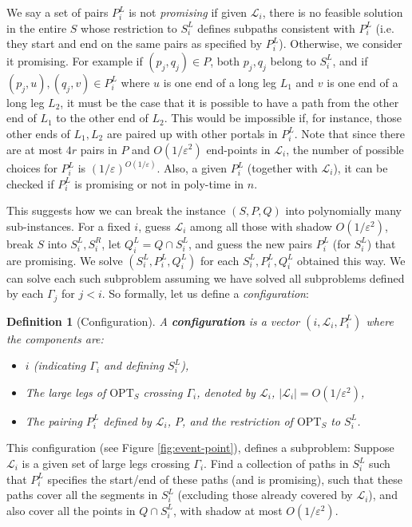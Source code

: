 \documentclass[10pt,a4paper]{amsart}
\theoremstyle{thmstyleone}
\newtheorem{definition}{Definition} %
\newcommand{\eps}{\varepsilon}
\newcommand{\OPT}{{\text{OPT}}}
\begin{document}
We say a set of pairs $P^L_i$ is not {\em promising} if given $\mathcal L_i$, there is no feasible solution in the
entire $S$ whose restriction to $S^L_i$ defines subpaths consistent with $P^L_i$ 
(i.e. they start and end on the same pairs as specified by $P^L_i$). Otherwise, we consider it promising.
For example if $(p_j,q_j)\in P$,
both $ p_j, q_j $ belong to $S^L_i$, and if $(p_j,u),(q_j,v)\in P^L_i$ where $u$ is one end of a long leg $L_1$
and $v$ is one end of a long leg $L_2$, it must be the case that it is possible to have a path from the other end of $L_1$ to the other end of $L_2$. This would be impossible if, for instance, those other ends of $L_1,L_2$ are paired up with other portals in $P^L_i$. 
Note that since there are at most $4r$ pairs in $P$ and $O(1/\eps^2)$ end-points in $\mathcal L_i$,
the number of possible choices for $P^L_i$ is $(1/\eps)^{O(1/\eps)}$. Also, a given $P^L_i$  (together with $\mathcal L_i$), it can be checked if $ P^L_i $ is promising or not in poly-time in $ n $.

This suggests how we can break the instance $(S,P,Q)$ into polynomially many sub-instances.
For a fixed $i$, guess $\mathcal L_i$ among all those with shadow $O(1/\eps^2)$, break $S$ into $S^L_i,S^R_i$, let $Q^L_i=Q\cap S^L_i$, and guess
the new pairs $P^L_i$ (for $S^L_i$) that are promising. We solve $(S^L_i,P^L_i,Q^L_i)$ for each $S^L_i,P^L_i,Q^L_i$ obtained this way. 
We can solve each such subproblem assuming we have solved all subproblems defined by each $\Gamma_j$ for $j<i$. So formally, let us define a {\em configuration}:
\begin{definition}[Configuration]
 A \textbf{configuration} is a vector $ (i, \mathcal L_i, P^L_i) $ where the components are:
\begin{itemize}
    \item $i$ (indicating $\Gamma_i$ and defining $S^L_i$),
    \item The large legs of $\OPT_S$ crossing $\Gamma_i$, denoted by $\mathcal L_i$, $|\mathcal L_i|=O(1/\eps^2)$,
    \item The pairing $P^L_i$ defined by $\mathcal L_i$, $P$, and the restriction of $\OPT_S$ to $S^L_i$.
\end{itemize}
\end{definition}


This configuration (see Figure \ref{fig:event-point}), defines a subproblem: Suppose $\mathcal L_i$ is a given set of large legs crossing $\Gamma_i$.
Find a collection of paths in $S^L_i$ such that $P^L_i$ specifies the start/end of these paths (and is promising), such that these paths cover all the segments in $S^L_i$ (excluding those already covered by $\mathcal L_i$), and also cover all the points in $Q\cap S^L_i$, with shadow at most $O(1/\eps^2)$. 
\end{document}
